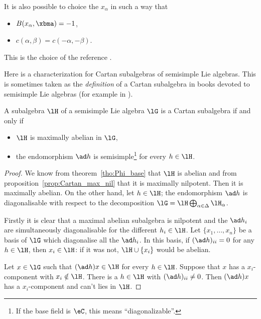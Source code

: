 \begin{remark}
It is also possible to choice the $ x_{\alpha}$ in such a way that

\begin{itemize}
\item $B( x_{\alpha},\xbma)=-1$,
\item $c(\alpha,\beta)=c(-\alpha,-\beta)$.
\end{itemize}
This is the choice of the reference \cite{Hochschild}.
\end{remark}


Here is a characterization for Cartan subalgebras of semisimple Lie algebras. This is sometimes taken as the \emph{definition} of a Cartan subalgebra in books devoted to semisimple Lie algebras (for example in \cite{Helgason}).
\begin{proposition}     \label{PropCartanMaxAnel}
    A subalgebra $\lH$ of a semisimple Lie algebra $\lG$ is a Cartan subalgebra if and only if
    \begin{itemize}
        \item $\lH$ is maximally abelian in $\lG$,
        \item the endomorphism $\ad h$ is semisimple\footnote{If the base field is \( \eC\), this means ``diagonalizable''.} for every $h\in\lH$.
    \end{itemize}
\end{proposition}

\begin{proof}
 We know from theorem~\ref{tho:Phi_base} that $\lH$ is abelian and from proposition~\ref{prop:Cartan_max_nil} that it is maximally nilpotent. Then it is maximally abelian. On the other hand, let $h\in\lH$; the endomorphism $\ad h$ is diagonalisable with respect to the decomposition $\lG=\lH\bigoplus_{\alpha\in\Delta}\lH_{\alpha}$.

Firstly it is clear that a maximal abelian subalgebra is nilpotent and the $\ad h_i$ are simultaneously diagonalisable for the different $h_i\in\lH$. Let $\{x_1,\ldots,x_n\}$ be a basis of $\lG$ which diagonalise all the $\ad h_i$. In this basis, if $(\ad h)_{ii}=0$ for any $h\in\lH$, then $x_i\in\lH$: if it was not, $\lH\cup\{x_i\}$ would be abelian.

Let $x\in\lG$ such that $(\ad h)x\in\lH$ for every $h\in\lH$. Suppose that $x$ has a $x_i$-component with $x_i\notin\lH$. There is a $h\in\lH$ with $(\ad h)_{ii}\neq 0$. Then $(\ad h)x$ has a $x_i$-component and can't lies in $\lH$.

\end{proof}

